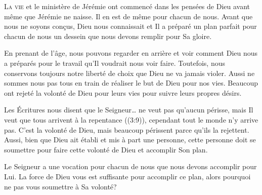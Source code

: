 \lettrine{L}{a vie} et le ministère de Jérémie ont commencé
 dans les pensées de Dieu avant même que Jérémie ne naisse.
 Il en est de même pour chacun de nous. Avant que nous ne soyons con\c{c}us,
 Dieu nous connaissait et Il a préparé un plan parfait pour chacun de nous
 \ocadr un dessein que nous devons remplir pour Sa gloire. 

En prenant de l'âge, nous pouvons regarder en arrière et voir
 comment Dieu nous a préparés pour le travail qu'Il voudrait nous voir faire.
 Toutefois, nous conservons toujours notre liberté de choix que Dieu
 ne va jamais violer. Aussi ne sommes nous pas tous en train de réaliser
 le but de Dieu pour nos vies. Beaucoup ont rejeté la volonté de Dieu
 pour leurs vies pour suivre leurs propres désirs. 


Les Écritures nous disent que \Og le 
 Seigneur\dots{} ne veut pas qu'aucun périsse, mais Il veut que tous arrivent
 à la repentance \Fg{} ((3:9)), cependant tout le monde
 n'y arrive pas. C'est la volonté de Dieu, mais beaucoup périssent
 parce qu'ils la rejettent. Aussi, bien que Dieu ait établi et mis à part
 une personne, cette personne doit se soumettre pour faire cette volonté
 de Dieu et accomplir Son plan. 

Le Seigneur a une vocation pour chacun de nous que nous devons accomplir
 pour Lui. La force de Dieu vous est suffisante pour accomplir ce plan,
 alors pourquoi ne pas vous soumettre à Sa volonté? 

\dvrule






